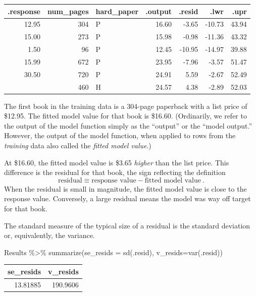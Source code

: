 \documentclass[
  letterpaper,
  DIV=11,
  numbers=noendperiod,
  oneside]{scrreprt}
\newenvironment{Shaded}{\begin{snugshade}}{\end{snugshade}}
\newcommand{\AttributeTok}[1]{\textcolor[rgb]{0.40,0.45,0.13}{#1}}
\newcommand{\FunctionTok}[1]{\textcolor[rgb]{0.28,0.35,0.67}{#1}}
\newcommand{\NormalTok}[1]{\textcolor[rgb]{0.00,0.23,0.31}{#1}}
\newcommand{\SpecialCharTok}[1]{\textcolor[rgb]{0.37,0.37,0.37}{#1}}
\begin{document}
\ttfamily 
\begin{tabular}{rrlrrrr}
\toprule
.response & num\_pages & hard\_paper & .output & .resid & .lwr & .upr\\
\midrule
12.95 & 304 & P & 16.60 & -3.65 & -10.73 & 43.94\\
15.00 & 273 & P & 15.98 & -0.98 & -11.36 & 43.32\\
1.50 & 96 & P & 12.45 & -10.95 & -14.97 & 39.88\\
15.99 & 672 & P & 23.95 & -7.96 & -3.57 & 51.47\\
30.50 & 720 & P & 24.91 & 5.59 & -2.67 & 52.49\\
\addlinespace
28.95 & 460 & H & 24.57 & 4.38 & -2.89 & 52.03\\
\bottomrule
\end{tabular} \normalfont
\bigskip

The first book in the training data is a 304-page paperback with a list
price of \$12.95. The fitted model value for that book is \$16.60.
(Ordinarily, we refer to the output of the model function simply as the
``output'' or the ``model output.'' However, the output of the model
function, when applied to rows from the \emph{training} data also called
the \emph{fitted model value}.)

At \$16.60, the fitted model value is \$3.65 \emph{higher} than the list
price. This difference is the residual for that book, the sign
reflecting the definition
\[\text{residual} \equiv \text{response value} - \text{fitted model value}\ .\]
When the residual is small in magnitude, the fitted model value is close
to the response value. Conversely, a large residual means the model was
way off target for that book.

The standard measure of the typical size of a residual is the standard
deviation or, equivalently, the variance.

\begin{Shaded}
\begin{Highlighting}[]
\NormalTok{Results }\SpecialCharTok{\%\textgreater{}\%} \FunctionTok{summarize}\NormalTok{(}\AttributeTok{se\_resids =} \FunctionTok{sd}\NormalTok{(.resid), }\AttributeTok{v\_resids=}\FunctionTok{var}\NormalTok{(.resid))}
\end{Highlighting}
\end{Shaded}

\ttfamily 
\begin{tabular}{rr}
\toprule
se\_resids & v\_resids\\
\midrule
13.81885 & 190.9606\\
\bottomrule
\end{tabular} \normalfont
\bigskip
\end{document}
